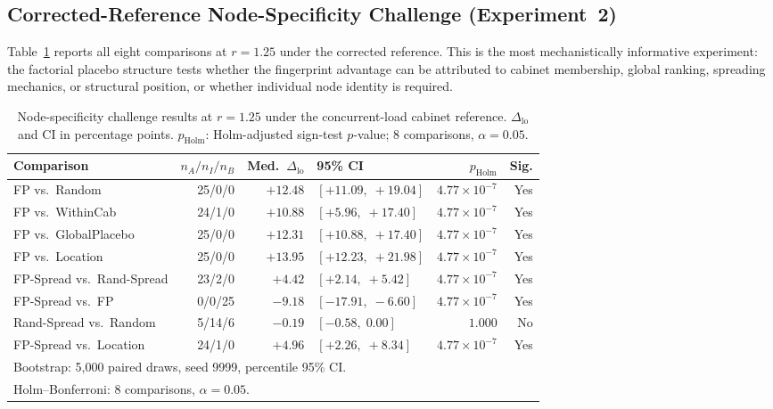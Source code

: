 \documentclass[acmsmall,screen,review,anonymous]{acmart}
\newcommand{\dlo}{\ensuremath{\Delta_{\mathrm{lo}}}\xspace}
\begin{document}
\subsection{Corrected-Reference Node-Specificity Challenge (Experiment~2)}
\label{sec:exp2}

Table~\ref{tab:exp2} reports all eight comparisons at $r = 1.25$ under the corrected
reference.  This is the most mechanistically informative experiment: the factorial
placebo structure tests whether the fingerprint advantage can be attributed to
cabinet membership, global ranking, spreading mechanics, or structural position,
or whether individual node identity is required.

\begin{table}[t]
\caption{Node-specificity challenge results at $r = 1.25$ under the concurrent-load
cabinet reference.  $\dlo$ and CI in percentage points.
$p_\mathrm{Holm}$: Holm-adjusted sign-test $p$-value; 8 comparisons, $\alpha = 0.05$.}
\label{tab:exp2}
\begin{tabular}{lrrlrr}
\toprule
Comparison & $n_A/n_I/n_B$ & Med.\ $\dlo$ & 95\% CI & $p_\mathrm{Holm}$ & Sig. \\
\midrule
FP vs.\ Random       & 25/0/0  & $+12.48$ & $[+11.09,\;+19.04]$ & $4.77\!\times\!10^{-7}$ & Yes \\
FP vs.\ WithinCab   & 24/1/0  & $+10.88$ & $[+5.96,\;+17.40]$  & $4.77\!\times\!10^{-7}$ & Yes \\
FP vs.\ GlobalPlacebo & 25/0/0 & $+12.31$ & $[+10.88,\;+17.40]$ & $4.77\!\times\!10^{-7}$ & Yes \\
FP vs.\ Location     & 25/0/0  & $+13.95$ & $[+12.23,\;+21.98]$ & $4.77\!\times\!10^{-7}$ & Yes \\
FP-Spread vs.\ Rand-Spread & 23/2/0 & $+4.42$ & $[+2.14,\;+5.42]$ & $4.77\!\times\!10^{-7}$ & Yes \\
FP-Spread vs.\ FP   & 0/0/25  & $-9.18$  & $[-17.91,\;-6.60]$  & $4.77\!\times\!10^{-7}$ & Yes \\
Rand-Spread vs.\ Random & 5/14/6 & $-0.19$ & $[-0.58,\;0.00]$  & $1.000$                 & No  \\
FP-Spread vs.\ Location & 24/1/0 & $+4.96$ & $[+2.26,\;+8.34]$  & $4.77\!\times\!10^{-7}$ & Yes \\
\bottomrule
\multicolumn{6}{l}{\footnotesize Bootstrap: 5,000 paired draws, seed 9999, percentile 95\% CI.} \\
\multicolumn{6}{l}{\footnotesize Holm--Bonferroni: 8 comparisons, $\alpha = 0.05$.}
\end{tabular}
\end{table}
\end{document}
